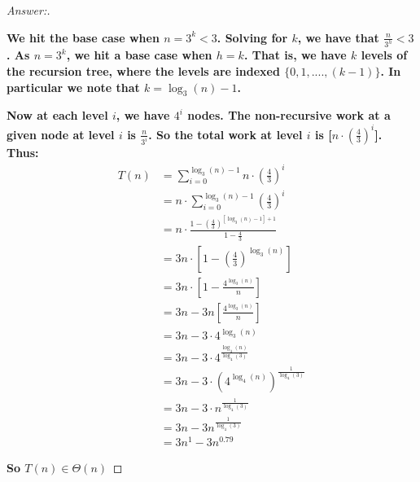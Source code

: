 \documentclass[11pt]{article}
\theoremstyle{definition}
\theoremstyle{definition}
\theoremstyle{definition}
\begin{document}
\begin{proof}[Answer:] \
\item \textbf{We hit the base case when $n = 3^{k} < 3$. Solving for $k$, we have that $\frac{n}{3^{h}} < 3$. As $n = 3^{k}$, we hit a base case when $h = k$. That is, we have $k$ levels of the recursion tree, where the levels are indexed $\{0, 1, .... , (k - 1)\}$. In particular we note that $k = \log_3(n) - 1$.} \\

\item \textbf{Now at each level $i$, we have $4^{i}$ nodes. The non-recursive work at a given node at level $i$ is $\frac{n}{3^{i}}$. So the total work at level $i$ is [$n \cdot (\frac{4}{3})^{i}$]. Thus:} \\

\begin{align*}
T(n) &= \sum_{i = 0}^{\log_3(n) - 1} n \cdot (\frac{4}{3})^{i} \\
&= n \cdot \sum_{i = 0}^{\log_3(n) - 1} (\frac{4}{3})^{i} \\
&= n \cdot \frac{1 - (\frac{4}{3})^{[\log_3(n) - 1] + 1}}{1 - \frac{4}{3}} \\
&= 3n \cdot [1 - (\frac{4}{3})^{\log_3(n)}] \\
&= 3n \cdot [1 - \frac{4^{\log_{3}(n)}}{n}] \\
&= 3n - 3n[\frac{4^{\log_{3}(n)}}{n}] \\
&= 3n - 3 \cdot 4^{\log_{3}(n)} \\
&= 3n - 3 \cdot 4^{\frac{\log_{4}(n)}{\log_{4}(3)}} \\
&= 3n - 3 \cdot (4^{\log_{4}(n)})^{\frac{1}{\log_{4}(3)}} \\
&= 3n - 3 \cdot n^{\frac{1}{\log_{4}(3)}} \\
&= 3n - 3n^{\frac{1}{\log_{4}(3)}} \\
&= 3n^{1} - 3n^{0.79}
\end{align*}
\item \textbf{So \color{red}$T(n) \in \Theta(n)$\color{black}}
\end{proof}




\end{document}
